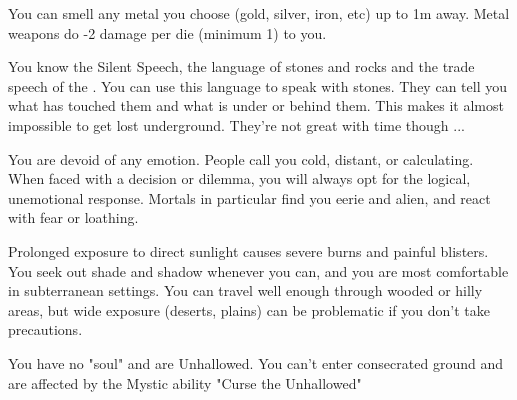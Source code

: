 {  

  You can smell any metal you choose (gold, silver, iron, etc) up to 1m away.  Metal weapons do -2 damage per die (minimum 1) to you.  


  You know the Silent Speech, the language of stones and rocks and the trade speech of the .  You can use this language to speak with stones. They can tell you what has touched them and what is under or behind them.  This makes it almost impossible to get lost underground. They're not great with time though ...








  You are devoid of any emotion.  People call you cold, distant, or calculating.  When faced with a decision or dilemma, you will always opt for the logical, unemotional response.  Mortals in particular find you eerie and alien, and react with fear or loathing.



  Prolonged exposure to direct sunlight causes severe burns and painful blisters.  You seek out shade and shadow whenever you can, and you are most comfortable in subterranean settings.  You can travel well enough through wooded or hilly areas, but wide exposure (deserts, plains) can be problematic if you don't take precautions.


    
  You have no "soul" and are Unhallowed. You can't enter consecrated ground and are affected by the Mystic ability "Curse the Unhallowed"

  \cbreak






}
